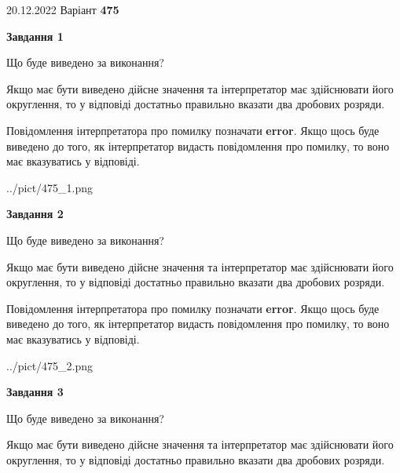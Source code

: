 \documentclass[12pt, ukrainian]{article}
\begin{document}
{20.12.2022 Варіант \No \textbf { 475 }\par}
{
\begin {Large}

{\begin {center}\textbf{Завдання 1}\end {center}}\par
Що буде виведено за виконання? \par

Якщо має бути виведено дійсне значення та інтерпретатор має здійснювати його округлення, 
то у відповіді достатньо правильно вказати два дробових розряди.

Повідомлення інтерпретатора про помилку позначати \textbf{error}.
Якщо щось буде виведено до того, як інтерпретатор видасть повідомлення про помилку, 
то воно має вказуватись у відповіді. \par

\begin{center}
	{../pict/475_1.png}
\end{center}
\newpage

{\begin {center}\textbf{Завдання 2}\end {center}}\par
Що буде виведено за виконання? \par

Якщо має бути виведено дійсне значення та інтерпретатор має здійснювати його округлення, 
то у відповіді достатньо правильно вказати два дробових розряди.

Повідомлення інтерпретатора про помилку позначати \textbf{error}.
Якщо щось буде виведено до того, як інтерпретатор видасть повідомлення про помилку, 
то воно має вказуватись у відповіді. \par

\begin{center}
	{../pict/475_2.png}
\end{center}
\newpage

{\begin {center}\textbf{Завдання 3}\end {center}}\par
Що буде виведено за виконання? \par

Якщо має бути виведено дійсне значення та інтерпретатор має здійснювати його округлення, 
то у відповіді достатньо правильно вказати два дробових розряди.


\end{Large}}
\end{document}
